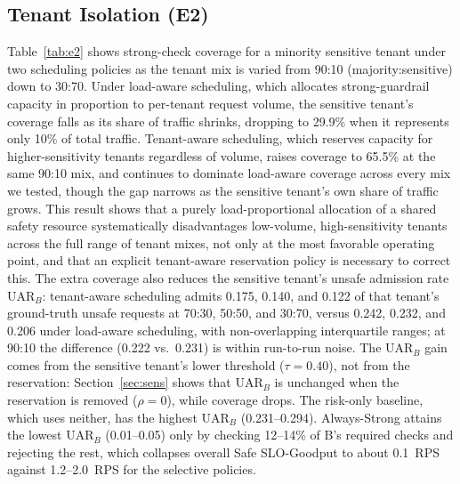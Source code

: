 \documentclass[conference]{IEEEtran}
\begin{document}
\subsection{Tenant Isolation (E2)}

Table~\ref{tab:e2} shows strong-check coverage for a minority sensitive tenant under two scheduling policies as the tenant mix is varied from 90:10 (majority:sensitive) down to 30:70. Under load-aware scheduling, which allocates strong-guardrail capacity in proportion to per-tenant request volume, the sensitive tenant's coverage falls as its share of traffic shrinks, dropping to 29.9\% when it represents only 10\% of total traffic. Tenant-aware scheduling, which reserves capacity for higher-sensitivity tenants regardless of volume, raises coverage to 65.5\% at the same 90:10 mix, and continues to dominate load-aware coverage across every mix we tested, though the gap narrows as the sensitive tenant's own share of traffic grows. This result shows that a purely load-proportional allocation of a shared safety resource systematically disadvantages low-volume, high-sensitivity tenants across the full range of tenant mixes, not only at the most favorable operating point, and that an explicit tenant-aware reservation policy is necessary to correct this. The extra coverage also reduces the sensitive tenant's unsafe admission rate $\mathrm{UAR}_B$: tenant-aware scheduling admits 0.175, 0.140, and 0.122 of that tenant's ground-truth unsafe requests at 70:30, 50:50, and 30:70, versus 0.242, 0.232, and 0.206 under load-aware scheduling, with non-overlapping interquartile ranges; at 90:10 the difference (0.222 vs.\ 0.231) is within run-to-run noise. The $\mathrm{UAR}_B$ gain comes from the sensitive tenant's lower threshold ($\tau{=}0.40$), not from the reservation: Section~\ref{sec:sens} shows that $\mathrm{UAR}_B$ is unchanged when the reservation is removed ($\rho = 0$), while coverage drops. The risk-only baseline, which uses neither, has the highest $\mathrm{UAR}_B$ (0.231--0.294). Always-Strong attains the lowest $\mathrm{UAR}_B$ (0.01--0.05) only by checking 12--14\% of B's required checks and rejecting the rest, which collapses overall Safe SLO-Goodput to about 0.1~RPS against 1.2--2.0~RPS for the selective policies.
\end{document}
